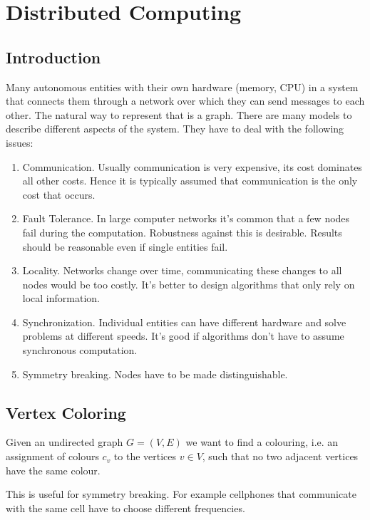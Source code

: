 \chapter{Distributed Computing}

\section{Introduction}

Many autonomous entities with their own hardware (memory, CPU) in a system that connects them through a network over which they can send messages to each other. The natural way to represent that is a graph. There are many models to describe different aspects of the system. They have to deal with the following issues:

\begin{enumerate}
\item Communication. Usually communication is very expensive, its cost dominates all other costs. Hence it is typically assumed that communication is the only cost that occurs.
\item Fault Tolerance. In large computer networks it's common that a few nodes fail during the computation. Robustness against this is desirable. Results should be reasonable even if single entities fail.
\item Locality. Networks change over time, communicating these changes to all nodes would be too costly. It's better to design algorithms that only rely on local information.
\item Synchronization. Individual entities can have different hardware and solve problems at different speeds. It's good if algorithms don't have to assume synchronous computation.
\item Symmetry breaking. Nodes have to be made distinguishable.
\end{enumerate}

\section{Vertex Coloring}

Given an undirected graph $G=(V,E)$ we want to find a colouring, i.e. an assignment of colours $c_v$ to the vertices $v\in V$, such that no two adjacent vertices have the same colour.

This is useful for symmetry breaking. For example cellphones that communicate with the same cell have to choose different frequencies.

